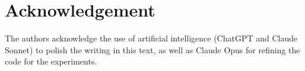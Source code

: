 \documentclass[conference,a4paper]{APSIPA2026}
\begin{document}
\section*{Acknowledgement}

The authors acknowledge the use of artificial intelligence (ChatGPT and Claude Sonnet) to polish the writing in this text, as well as Claude Opus for refining the code for the experiments.










\printbibliography
\end{document}

